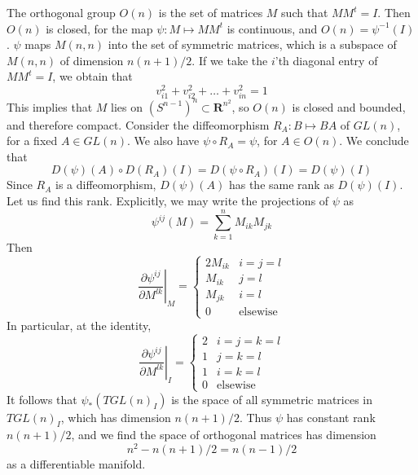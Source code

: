 \begin{example}
    The orthogonal group $O(n)$ is the set of matrices $M$ such that $MM^t = I$. Then $O(n)$ is closed, for the map $\psi: M \mapsto MM^t$ is continuous, and $O(n) = \psi^{-1}(I)$. $\psi$ maps $M(n,n)$ into the set of symmetric matrices, which is a subspace of $M(n,n)$ of dimension $n(n+1)/2$. If we take the $i$'th diagonal entry of $MM^t = I$, we obtain that
    \[ v_{i1}^2 + v_{i2}^2 + \dots + v_{in}^2 = 1 \]
    This implies that $M$ lies on $(S^{n-1})^n \subset \mathbf{R}^{n^2}$, so $O(n)$ is closed and bounded, and therefore compact. Consider the diffeomorphism $R_A: B \mapsto BA$ of $GL(n)$, for a fixed $A \in GL(n)$. We also have $\psi \circ R_A = \psi$, for $A \in O(n)$. We conclude that
    \[ D(\psi)(A) \circ D(R_A)(I) = D(\psi \circ R_A)(I) = D(\psi)(I) \]
    Since $R_A$ is a diffeomorphism, $D(\psi)(A)$ has the same rank as $D(\psi)(I)$. Let us find this rank. Explicitly, we may write the projections of $\psi$ as
    \[ \psi^{ij}(M) = \sum_{k = 1}^n M_{ik}M_{jk} \]
    Then
    \[ \left.\frac{\partial \psi^{ij}}{\partial M^{lk}}\right|_M = \begin{cases} 2 M_{ik} & i = j = l \\ M_{ik} & j = l \\ M_{jk} & i = l \\ 0 & \text{elsewise} \end{cases} \]
    In particular, at the identity,
    \[ \left.\frac{\partial \psi^{ij}}{\partial M^{lk}}\right|_I = \begin{cases} 2 & i = j = k = l \\ 1 & j = k = l \\ 1 & i = k = l \\ 0 & \text{elsewise} \end{cases} \]
    It follows that $\psi_*(TGL(n)_I)$ is the space of all symmetric matrices in $TGL(n)_I$, which has dimension $n(n+1)/2$. Thus $\psi$ has constant rank $n(n+1)/2$, and we find the space of orthogonal matrices has dimension
    \[ n^2 - n(n+1)/2 = n(n-1)/2 \]
    as a differentiable manifold.
\end{example}

